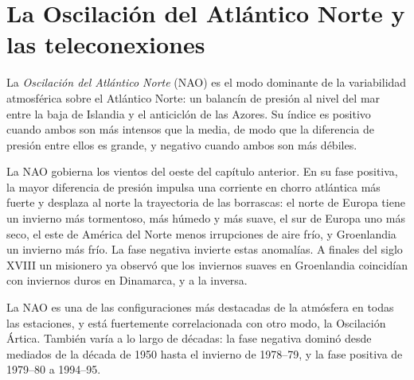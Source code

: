 \section{La Oscilación del Atlántico Norte y las teleconexiones}\label{sec:b2:climate-variability:nao}

\begin{definition}\label{def:b2:climate-variability:nao}
La \emph{Oscilación del Atlántico Norte} (NAO) es el modo dominante
de la variabilidad atmosférica sobre el Atlántico Norte: un balancín de presión al nivel del mar entre la
baja de Islandia y el anticiclón de las Azores. Su índice es positivo cuando ambos son más intensos que la media, de modo
que la diferencia de presión entre ellos es grande, y negativo cuando ambos son más débiles.
\end{definition}

La NAO gobierna los vientos del oeste del capítulo anterior. En su fase positiva, la mayor diferencia
de presión impulsa una corriente en chorro atlántica más fuerte y desplaza al norte la trayectoria de las borrascas: el norte de Europa
tiene un invierno más tormentoso, más húmedo y más suave, el sur de Europa uno más seco, el este de América del Norte
menos irrupciones de aire frío, y Groenlandia un invierno más frío. La fase negativa invierte estas
anomalías. A finales del siglo XVIII un misionero ya observó que los inviernos suaves en
Groenlandia coincidían con inviernos duros en Dinamarca, y a la inversa.

La NAO es una de las configuraciones más destacadas de la atmósfera en todas las estaciones, y está
fuertemente correlacionada con otro modo, la Oscilación Ártica. También varía a lo largo de décadas: la fase negativa dominó
desde mediados de la década de 1950 hasta el invierno de 1978--79, y la fase positiva de 1979--80 a 1994--95.

